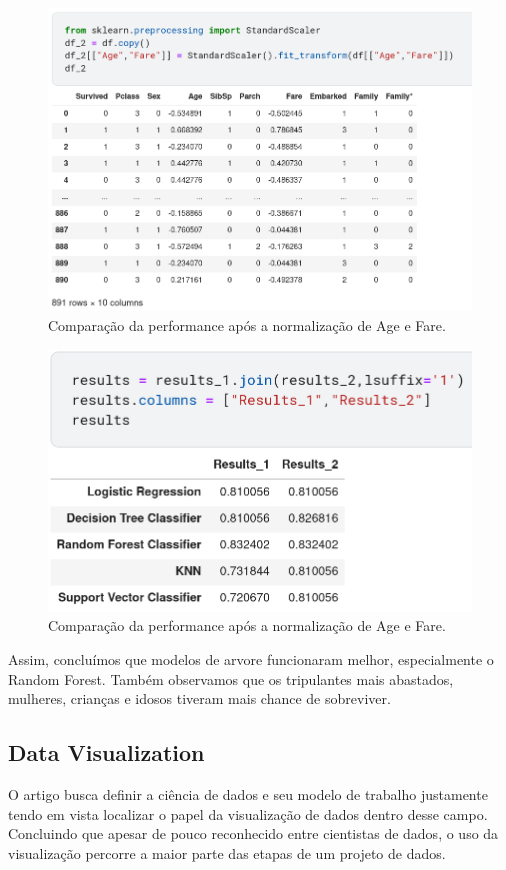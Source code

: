 \documentclass{article}
\begin{document}
\begin{figure}[H]
\centering
\includegraphics[width=\textwidth]{Figures/normalized.png}
\caption{\label{normalized}Comparação da performance após a normalização de Age e Fare.}
\end{figure}
\begin{figure}[H]
\centering
\includegraphics[width=\textwidth]{Figures/results1_2.png}
\caption{\label{ml.results2}Comparação da performance após a normalização de Age e Fare.}
\end{figure}
Assim, concluímos que modelos de arvore funcionaram melhor, especialmente o Random Forest. Também observamos que os tripulantes mais abastados, mulheres, crianças e idosos tiveram mais chance de sobreviver.

\subsection{Data Visualization}
O artigo \cite{BATON} busca definir a ciência de dados e seu modelo de trabalho justamente tendo em vista localizar o papel da visualização de dados dentro desse campo. Concluindo que apesar de pouco reconhecido entre cientistas de dados, o uso da visualização percorre a maior parte das etapas de um projeto de dados. 
\end{document}
